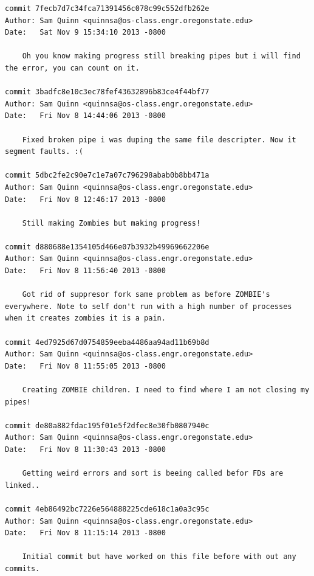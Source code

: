 \documentclass[letterpaper,10pt,notitlepage,fleqn]{article}
\begin{document}
\begin{verbatim}
commit 7fecb7d7c34fca71391456c078c99c552dfb262e
Author: Sam Quinn <quinnsa@os-class.engr.oregonstate.edu>
Date:   Sat Nov 9 15:34:10 2013 -0800

    Oh you know making progress still breaking pipes but i will find the error, you can count on it.

commit 3badfc8e10c3ec78fef43632896b83ce4f44bf77
Author: Sam Quinn <quinnsa@os-class.engr.oregonstate.edu>
Date:   Fri Nov 8 14:44:06 2013 -0800

    Fixed broken pipe i was duping the same file descripter. Now it segment faults. :(

commit 5dbc2fe2c90e7c1e7a07c796298abab0b8bb471a
Author: Sam Quinn <quinnsa@os-class.engr.oregonstate.edu>
Date:   Fri Nov 8 12:46:17 2013 -0800

    Still making Zombies but making progress!

commit d880688e1354105d466e07b3932b49969662206e
Author: Sam Quinn <quinnsa@os-class.engr.oregonstate.edu>
Date:   Fri Nov 8 11:56:40 2013 -0800

    Got rid of suppresor fork same problem as before ZOMBIE's everywhere. Note to self don't run with a high number of processes when it creates zombies it is a pain.

commit 4ed7925d67d0754859eeba4486aa94ad11b69b8d
Author: Sam Quinn <quinnsa@os-class.engr.oregonstate.edu>
Date:   Fri Nov 8 11:55:05 2013 -0800

    Creating ZOMBIE children. I need to find where I am not closing my pipes!

commit de80a882fdac195f01e5f2dfec8e30fb0807940c
Author: Sam Quinn <quinnsa@os-class.engr.oregonstate.edu>
Date:   Fri Nov 8 11:30:43 2013 -0800

    Getting weird errors and sort is beeing called befor FDs are linked..

commit 4eb86492bc7226e564888225cde618c1a0a3c95c
Author: Sam Quinn <quinnsa@os-class.engr.oregonstate.edu>
Date:   Fri Nov 8 11:15:14 2013 -0800

    Initial commit but have worked on this file before with out any commits.
    
    
\end{verbatim}
\end{document}

